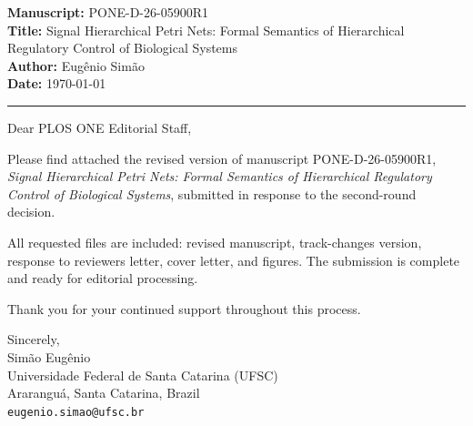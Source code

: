 \documentclass[11pt,letterpaper]{article}
\begin{document}
\textbf{Manuscript:} PONE-D-26-05900R1\\
\textbf{Title:} Signal Hierarchical Petri Nets: Formal Semantics of
Hierarchical Regulatory Control of Biological Systems\\
\textbf{Author:} Eug\^{e}nio Sim\~{a}o\\
\textbf{Date:} \today

\bigskip\hrule\bigskip

Dear PLOS ONE Editorial Staff,

Please find attached the revised version of manuscript PONE-D-26-05900R1,
\textit{Signal Hierarchical Petri Nets: Formal Semantics of Hierarchical
Regulatory Control of Biological Systems}, submitted in response to the
second-round decision.

All requested files are included: revised manuscript, track-changes version,
response to reviewers letter, cover letter, and figures.
The submission is complete and ready for editorial processing.

Thank you for your continued support throughout this process.

\bigskip

Sincerely,\\[8pt]
Sim\~{a}o Eug\^{e}nio\\
Universidade Federal de Santa Catarina (UFSC)\\
Ararangu\'a, Santa Catarina, Brazil\\
\texttt{eugenio.simao@ufsc.br}
\end{document}
